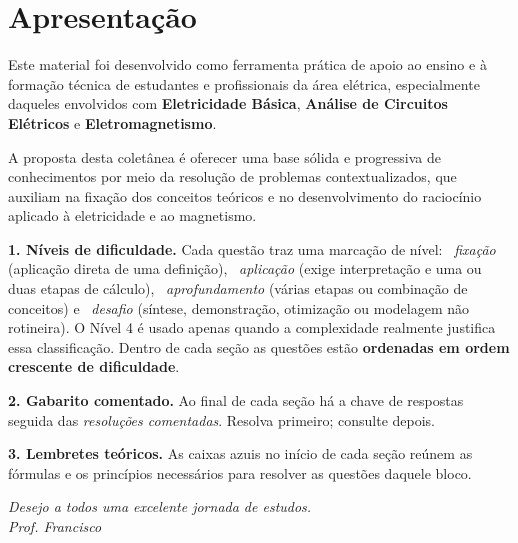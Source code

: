 \documentclass[11pt,a4paper,oneside]{article}
\begin{document}
\section*{Apresentação}
\thispagestyle{fancy}

Este material foi desenvolvido como ferramenta prática de apoio ao ensino e à
formação técnica de estudantes e profissionais da área elétrica, especialmente
daqueles envolvidos com \textbf{Eletricidade Básica}, \textbf{Análise de
Circuitos Elétricos} e \textbf{Eletromagnetismo}.

A proposta desta coletânea é oferecer uma base sólida e progressiva de
conhecimentos por meio da resolução de problemas contextualizados, que auxiliam
na fixação dos conceitos teóricos e no desenvolvimento do raciocínio aplicado à
eletricidade e ao magnetismo.

\begin{conceito}
\textbf{1. Níveis de dificuldade.} Cada questão traz uma marcação de nível:
~\emph{fixação} (aplicação direta de uma definição),
~\emph{aplicação} (exige interpretação e uma ou duas etapas de
cálculo), ~\emph{aprofundamento} (várias etapas ou combinação de
conceitos) e ~\emph{desafio} (síntese, demonstração, otimização ou
modelagem não rotineira). O Nível 4 é usado apenas quando a complexidade realmente
justifica essa classificação. Dentro de cada seção as questões estão
\textbf{ordenadas em ordem crescente de dificuldade}.

\smallskip
\textbf{2. Gabarito comentado.} Ao final de cada seção há a chave de respostas
seguida das \emph{resoluções comentadas}. Resolva primeiro; consulte depois.

\smallskip
\textbf{3. Lembretes teóricos.} As caixas azuis no início de cada seção reúnem as
fórmulas e os princípios necessários para resolver as questões daquele bloco.
\end{conceito}

\vspace{1em}
\begin{flushright}
\textit{Desejo a todos uma excelente jornada de estudos.}\\[2mm]
\textit{Prof. Francisco}
\end{flushright}

\newpage
\renewcommand{\contentsname}{\sffamily\color{azulprof}Sumário}
\tableofcontents
\end{document}
